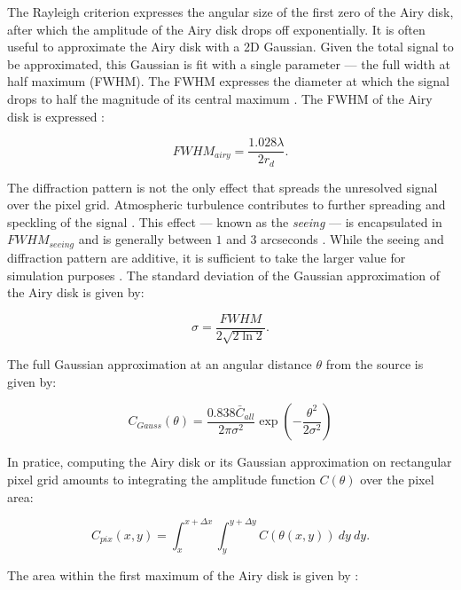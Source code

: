 The Rayleigh criterion expresses the angular size of the first zero of the Airy disk, after which the amplitude of the Airy disk drops off exponentially. It is often useful to approximate the Airy disk with a 2D Gaussian. Given the total signal to be approximated, this Gaussian is fit with a single parameter --- the full width at half maximum (FWHM). The FWHM expresses the diameter at which the signal drops to half the magnitude of its central maximum \cite{frueh2019notes}. The FWHM of the Airy disk is expressed \cite{frueh2019notes}:

\begin{equation} \label{eq:fwhm_airy}
  FWHM_{airy} = \frac{1.028 \lambda}{2 r_d}.
\end{equation}

The diffraction pattern is not the only effect that spreads the unresolved signal over the pixel grid. Atmospheric turbulence contributes to further spreading and speckling of the signal \cite{frueh2019notes}. This effect --- known as the \textit{seeing} --- is encapsulated in $FWHM_{seeing}$ and is generally between $1$ and $3$ arcseconds \cite{frueh2019notes}. While the seeing and diffraction pattern are additive, it is sufficient to take the larger value for simulation purposes \cite{frueh2019notes}. The standard deviation of the Gaussian approximation of the Airy disk is given by:

\begin{equation} \label{eq:airy_variance}
  \sigma = \frac{FWHM}{2 \sqrt{2 \ln{2}}}.
\end{equation}

The full Gaussian approximation at an angular distance $\theta$ from the source is given by:

\begin{equation} \label{eq:airy_gaussian}
  C_{Gauss}(\theta) = \frac{0.838 \bar{C}_{all}}{2 \pi \sigma^2} \exp\left( - \frac{\theta^2}{2 \sigma^2} \right)
\end{equation}

In pratice, computing the Airy disk or its Gaussian approximation on rectangular pixel grid amounts to integrating the amplitude function $C(\theta)$ over the pixel area:

\begin{equation}
  C_{pix}(x, y) = \int_{x}^{x + \Delta x} \int_{y}^{y + \Delta y}{C(\theta(x, y))} \: dy \: dy.
\end{equation}

The area within the first maximum of the Airy disk is given by \cite{frueh2019notes}:

